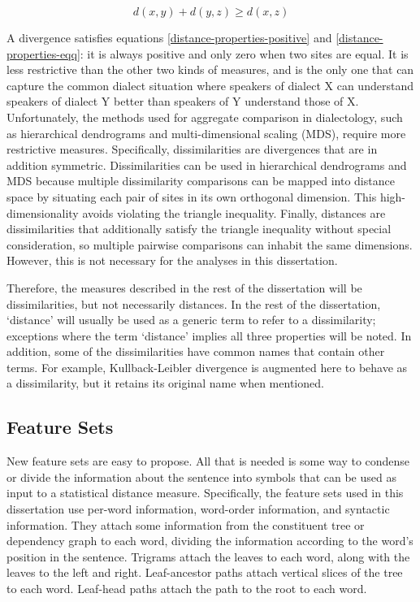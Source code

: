 \begin{equation}
  d(x,y) + d(y,z) \ge d(x,z)
\label{distance-properties-triangle}
\end{equation}

A divergence satisfies equations \ref{distance-properties-positive}
and \ref{distance-properties-eqq}: it is always positive and only zero
when two sites are equal. It is less restrictive than the other two
kinds of measures, and is the only one that can capture the common
dialect situation where speakers of dialect X can understand speakers
of dialect Y better than speakers of Y understand those of
X. Unfortunately, the methods used for aggregate comparison in
dialectology, such as hierarchical dendrograms and multi-dimensional
scaling (MDS), require more restrictive measures. Specifically,
dissimilarities are divergences that are in addition
symmetric. Dissimilarities can be used in hierarchical dendrograms and
MDS because multiple dissimilarity comparisons can be mapped into
distance space by situating each pair of sites in its own orthogonal
dimension. This high-dimensionality avoids violating the triangle
inequality. Finally, distances are dissimilarities that additionally
satisfy the triangle inequality without special consideration, so
multiple pairwise comparisons can inhabit the same
dimensions. However, this is not necessary for the analyses in this
dissertation.

Therefore, the measures described in the rest of the dissertation will
be dissimilarities, but not necessarily distances. In the rest of the
dissertation, `distance' will usually be used as a generic term to
refer to a dissimilarity; exceptions where the term `distance' implies
all three properties will be noted. In addition, some of the
dissimilarities have common names that contain other terms. For
example, Kullback-Leibler divergence is augmented here to behave as a
dissimilarity, but it retains its original name when mentioned.

\subsection{Feature Sets}

New feature sets are easy to propose. All that is needed is some way to
condense or divide the information about the sentence into symbols
that can be used as input to a statistical distance
measure. Specifically, the feature sets used in this dissertation use
per-word information, word-order information, and syntactic
information. They attach some information from the constituent tree or
dependency graph to each word, dividing the information according to
the word's position in the sentence. Trigrams attach the leaves to
each word, along with the leaves to the left and right.
Leaf-ancestor paths attach vertical slices of the tree to each
word. Leaf-head paths attach the path to the root to each word.

